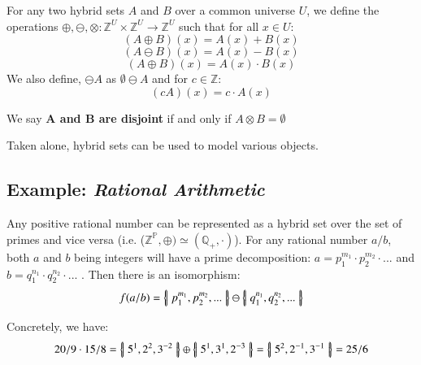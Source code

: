 \begin{definition}
	For any two hybrid sets $A$ and $B$ over a common universe $U$, 
	we define the operations $\oplus, \ominus, \otimes : \mathbb{Z}^U \times \mathbb{Z}^U \to \mathbb{Z}^U$ 
	such that for all $x \in U$:
	\begin{equation}
		(A \oplus B)(x) = A(x) + B(x)
	\end{equation}
	\begin{equation}
		(A \ominus B)(x) = A(x) - B(x)
	\end{equation}
	\begin{equation}
		(A \oplus B)(x) = A(x) \cdot B(x)
	\end{equation}
	We also define, $\ominus A$ as $\emptyset \ominus A$ and for $c \in \mathbb{Z}$:
	\begin{equation}
		(cA)(x) = c \cdot A(x)
	\end{equation}
\end{definition}


\begin{definition}
	We say \textbf{$\boldsymbol{A}$ and $\boldsymbol{B}$ are disjoint} if and only if $A \otimes B = \emptyset$
\end{definition}

Taken alone, hybrid sets can be used to model various objects. 


\subsection{Example: \emph{Rational Arithmetic}}


Any positive rational number can be represented as a hybrid set over the set of primes and vice versa  
(i.e. ($\mathbb{Z}^\mathbb{P}, \oplus) \simeq (\mathbb{Q}_+,\cdot)$).
For any rational number $a/b$, both $a$ and $b$ being integers will have a prime decomposition: 
$a=p_1^{m_1}\cdot p_2^{m_2} \cdot ...$ and $b=q_1^{n_1} \cdot q_2^{n_2} \cdot ...$ . 
Then there is an isomorphism:
\begin{equation}
	f(a/b) = \left\{ \! \left| \; p_1^{m_1}, p_2^{m_2}, ... \; \right| \! \right\} \ominus \left\{ \! \left| \; q_1^{n_1}, q_2^{n_2}, ... \; \right| \! \right\}
\end{equation}

\begin{example}
	Concretely, we have:
	\begin{equation*}
		20/9 \cdot 15/8 
			= \left\{ \! \left| \; 5^1, 2^2, 3^{-2} \; \right| \! \right\} \oplus \left\{ \! \left| \; 5^1, 3^1, 2^{-3} \; \right| \! \right\} 
			= \left\{ \! \left| \; 5^2, 2^{-1}, 3^{-1} \; \right| \! \right\} 
			= 25/6
	\end{equation*}
\end{example}

